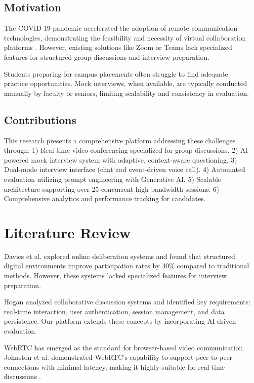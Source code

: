 \documentclass[conference]{IEEEtran}
\begin{document}
\subsection{Motivation}
The COVID-19 pandemic accelerated the adoption of remote communication technologies, demonstrating the feasibility and necessity of virtual collaboration platforms \cite{b2}. However, existing solutions like Zoom or Teams lack specialized features for structured group discussions and interview preparation. 

Students preparing for campus placements often struggle to find adequate practice opportunities. Mock interviews, when available, are typically conducted manually by faculty or seniors, limiting scalability and consistency in evaluation.

\subsection{Contributions}
This research presents a comprehensive platform addressing these challenges through: 
1) Real-time video conferencing specialized for group discussions.
2) AI-powered mock interview system with adaptive, context-aware questioning.
3) Dual-mode interview interface (chat and event-driven voice call).
4) Automated evaluation utilizing prompt engineering with Generative AI.
5) Scalable architecture supporting over 25 concurrent high-bandwidth sessions.
6) Comprehensive analytics and performance tracking for candidates.

\section{Literature Review}

Davies et al. \cite{b7} explored online deliberation systems and found that structured digital environments improve participation rates by 40\% compared to traditional methods. However, these systems lacked specialized features for interview preparation.

Hogan \cite{b8} analyzed collaborative discussion systems and identified key requirements: real-time interaction, user authentication, session management, and data persistence. Our platform extends these concepts by incorporating AI-driven evaluation.

WebRTC has emerged as the standard for browser-based video communication. Johnston et al. \cite{b1} demonstrated WebRTC's capability to support peer-to-peer connections with minimal latency, making it highly suitable for real-time discussions \cite{b12}.
\end{document}
